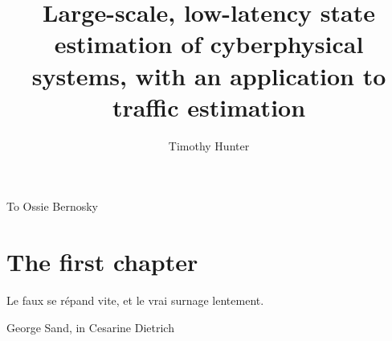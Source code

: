 \documentclass{ucbthesis}
\begin{document}

\title{Large-scale, low-latency state estimation of cyberphysical systems, with an application to traffic estimation}
\author{Timothy Hunter}




\maketitle
\approvalpage
\copyrightpage

% 

\begin{frontmatter}

\begin{dedication}
\null\vfil
\begin{center}
To Ossie Bernosky\\\vspace{12pt}
\end{center}
\vfil\null
\end{dedication}

\tableofcontents
\clearpage
\listoffigures
\clearpage
\listoftables

\begin{acknowledgements}

\end{acknowledgements}

\end{frontmatter}

\pagestyle{headings}



\chapter{The first chapter}
\epigraph{Le faux se répand vite, et le vrai surnage lentement.}{George Sand, in Cesarine Dietrich}






\end{document}
